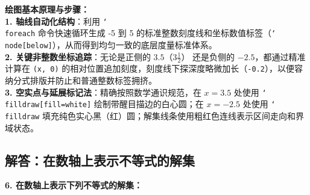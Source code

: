 {\small\color{blue!70!black}
\textbf{绘图基本原理与步骤：}\\
\textbf{1. 轴线自动化结构}：利用 \texttt{\char`\\foreach} 命令快速循环生成 -5 到 5 的标准整数刻度线和坐标数值标签（\texttt{\char`\\node[below]}），从而得到均匀一致的底层度量标准体系。\\
\textbf{2. 关键非整数坐标追踪}：无论是正侧的 $3.5$（$3\frac{1}{2}$） 还是负侧的 $-2.5$，都通过精准计算在 \texttt{(x, 0)} 的相对位置追加刻度，刻度线下探深度略微加长（\texttt{-0.2}），以便容纳分式排版并防止和普通整数标签拥挤。\\
\textbf{3. 空实点与延展标记法}：精确按照数学通识规范，在 $x=3.5$ 处使用 \texttt{\char`\\filldraw[fill=white]} 绘制带醒目描边的白心圆；在 $x=-2.5$ 处使用 \texttt{\char`\\filldraw} 填充纯色实心黑（红）圆；解集线条使用粗红色连线表示区间走向和界域状态。
}

\newpage

\newpage

\subsection{解答：在数轴上表示不等式的解集}

\vspace{0.6cm}

\textbf{6. 在数轴上表示下列不等式的解集：}

\vspace{0.4cm}

